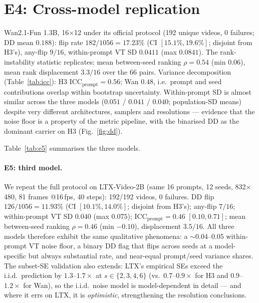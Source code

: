 \documentclass[10pt,twocolumn]{article}
\begin{document}
\section{E4: Cross-model replication}\label{sec:e4}
Wan2.1-Fun 1.3B, 16$\times$12 under its official protocol (192 unique videos,
0 failures; DD mean $0.188$): flip rate $182/1056=17.23\%$ (CI $[15.1\%, 19.6\%]$; disjoint from H3's), any-flip $9/16$,
within-prompt VT SD $0.0411$ (max $0.0841$). The rank-instability statistic
replicates: mean between-seed ranking $\rho=0.54$ (min $0.06$), mean rank
displacement $3.3/16$ over the 66 pairs. Variance decomposition
(Table~\ref{tab:icc}): H3 ICC$_{\text{prompt}}{=}0.56$; Wan $0.48$, i.e.\
prompt and seed contributions overlap within bootstrap uncertainty. Within-prompt SD is almost
similar across the three models ($0.051$ / $0.041$ / $0.040$; population-SD means) despite very different
architectures, samplers and resolutions --- evidence that the noise floor is a
property of the metric pipeline, with the binarised DD as the dominant carrier
on H3 (Fig.~\ref{fig:dd}).

Table~\ref{tab:e5} summarises the three models. \paragraph{E5: third model.}
We repeat the full protocol on LTX-Video-2B (same 16 prompts, 12 seeds,
832$\times$480, 81 frames @16\,fps, 40 steps): 192/192 videos, 0 failures.
DD flip $126/1056 = 11.93\%$ (CI $[10.1\%, 14.0\%]$; disjoint from H3's);
any-flip $7/16$; within-prompt VT SD $0.040$ (max $0.075$);
ICC$_{\text{prompt}} = 0.46$ $[0.10, 0.71]$; mean between-seed ranking
$\rho = 0.46$ (min $-0.10$), displacement $3.5/16$. All three models therefore
exhibit the same qualitative phenomena: a $\sim$0.04--0.05 within-prompt VT
noise floor, a binary DD flag that flips across seeds at a model-specific but
always substantial rate, and near-equal prompt/seed variance shares. The
subset-SE validation also extends: LTX's empirical SEs exceed the i.i.d.\
prediction by $1.3$--$1.7\times$ at $s{\in}\{2,3,4,6\}$ (vs.\ $0.7$--$0.9\times$
for H3 and $0.9$--$1.2\times$ for Wan), so the i.i.d.\ noise model is
model-dependent in detail --- and where it errs on LTX, it is
\emph{optimistic}, strengthening the resolution conclusions.
\end{document}
